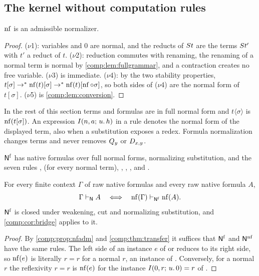 \subsection{The kernel without computation rules}

\begin{proposition}
\label{comp:prop:nfadm}
$\operatorname{nf}$ is an admissible normalizer.
\end{proposition}

\begin{proof}
($\nu$1): variables and $0$ are normal, and the reducts of $S t$ are the
terms $S t'$ with $t'$ a reduct of $t$. ($\nu$2): reduction commutes with
renaming, the renaming of a normal term is normal by
\cref{comp:lem:fullgrammar}, and a contraction creates no free variable.
($\nu$3) is immediate. ($\nu$4): by the two stability properties,
$t[\sigma]\to^{*}\operatorname{nf}(t)[\sigma]\to^{*}\operatorname{nf}(t)[\operatorname{nf}\circ\sigma]$, so both
sides of ($\nu$4) are the normal form of $t[\sigma]$. ($\nu$5) is
\cref{comp:lem:conversion}.
\end{proof}

In the rest of this section terms and formulas are in full normal form and
$t\langle\sigma\rangle$ is $\operatorname{nf}(t[\sigma])$. An expression
$I(n,a;\,u.\,h)$ in a rule denotes the normal form of the displayed term,
also when a substitution exposes a redex. Formula normalization changes
terms and never removes $Q_{y}$ or $D_{x,y}$.

\begin{definition}
\label{comp:def:nfull}
$\mathsf{N}^{\mathrm{f}}$ has native formulas over full normal forms, normalizing
substitution, and the seven rules ,  (for every
normal term), , , ,  and
.
\end{definition}

\begin{theorem}
\label{comp:thm:full}
For every finite context $\Gamma$ of raw native formulas and every raw
native formula $A$,
\[
 \Gamma\vdash_{\mathsf{N}}A
 \quad\Longleftrightarrow\quad
 \operatorname{nf}(\Gamma)\vdash_{\mathsf{N}^{\mathrm f}}\operatorname{nf}(A).
\]
$\mathsf{N}^{\mathrm f}$ is closed under weakening, cut and normalizing
substitution, and \cref{comp:cor:bridge} applies to it.
\end{theorem}

\begin{proof}
By \cref{comp:prop:nfadm} and \cref{comp:thm:transfer} it suffices that
$\mathsf{N}^{\mathrm f}$ and $\mathsf{N}^{\operatorname{nf}}$ have the same rules. The left side of
an instance $e$ of  or  reduces to its right side,
so $\operatorname{nf}(e)$ is literally $r=r$ for a normal $r$, an instance of
. Conversely, for a normal $r$ the reflexivity $r=r$ is
$\operatorname{nf}(e)$ for the instance $I(0,r;\,u.\,0)=r$ of .
\end{proof}

